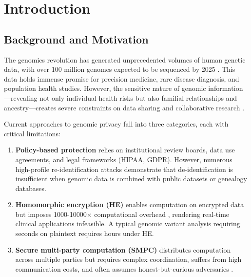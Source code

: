 \documentclass[11pt,a4paper]{article}
\begin{document}
\begin{abstract}
\textbf{Availability:} Open-source implementation at \url{https://github.com/rohanvinaik/GenomeVault}. Cryptographically signed validation bundles and reproducible benchmarks provided.

\textbf{Keywords:} privacy-preserving genomics, hyperdimensional computing, zero-knowledge proofs, private information retrieval, federated learning, biometric identification, genetic fingerprinting
\end{abstract}

\newpage
\tableofcontents
\newpage

\section{Introduction}

\subsection{Background and Motivation}

The genomics revolution has generated unprecedented volumes of human genetic data, with over 100 million genomes expected to be sequenced by 2025 \cite{birney2021genomics}. This data holds immense promise for precision medicine, rare disease diagnosis, and population health studies. However, the sensitive nature of genomic information—revealing not only individual health risks but also familial relationships and ancestry—creates severe constraints on data sharing and collaborative research \cite{gymrek2013identifying,erlich2014routes}.

Current approaches to genomic privacy fall into three categories, each with critical limitations:

\begin{enumerate}
    \item \textbf{Policy-based protection} relies on institutional review boards, data use agreements, and legal frameworks (HIPAA, GDPR). However, numerous high-profile re-identification attacks \cite{homer2008resolving,im2012sharing} demonstrate that de-identification is insufficient when genomic data is combined with public datasets or genealogy databases.

    \item \textbf{Homomorphic encryption (HE)} enables computation on encrypted data but imposes 1000-10000$\times$ computational overhead \cite{kim2015private,chen2016healer}, rendering real-time clinical applications infeasible. A typical genomic variant analysis requiring seconds on plaintext requires hours under HE.

    \item \textbf{Secure multi-party computation (SMPC)} distributes computation across multiple parties but requires complex coordination, suffers from high communication costs, and often assumes honest-but-curious adversaries \cite{kamm2013sharemind}.
\end{enumerate}
\end{document}

